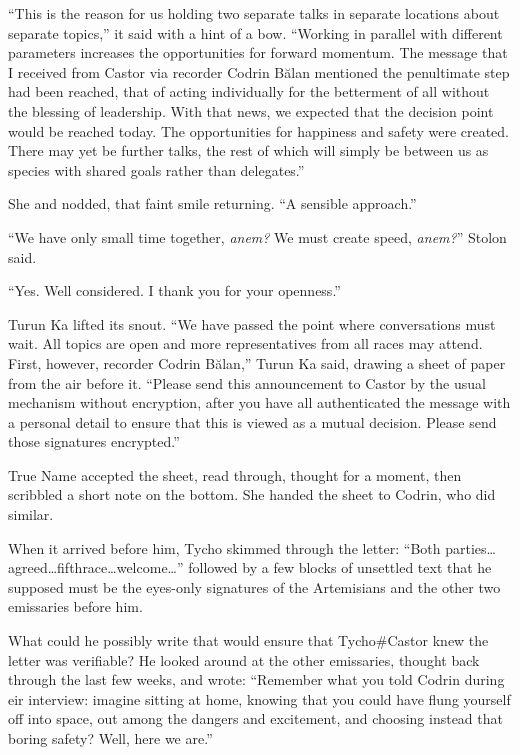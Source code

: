 ``This is the reason for us holding two separate talks in separate locations about separate topics,'' it said with a hint of a bow. ``Working in parallel with different parameters increases the opportunities for forward momentum. The message that I received from Castor via recorder Codrin Bălan mentioned the penultimate step had been reached, that of acting individually for the betterment of all without the blessing of leadership. With that news, we expected that the decision point would be reached today. The opportunities for happiness and safety were created. There may yet be further talks, the rest of which will simply be between us as species with shared goals rather than delegates.''

She and nodded, that faint smile returning. ``A sensible approach.''

``We have only small time together, \emph{anem?} We must create speed, \emph{anem?}'' Stolon said.

``Yes. Well considered. I thank you for your openness.''

Turun Ka lifted its snout. ``We have passed the point where conversations must wait. All topics are open and more representatives from all races may attend. First, however, recorder Codrin Bălan,'' Turun Ka said, drawing a sheet of paper from the air before it. ``Please send this announcement to Castor by the usual mechanism without encryption, after you have all authenticated the message with a personal detail to ensure that this is viewed as a mutual decision. Please send those signatures encrypted.''

True Name accepted the sheet, read through, thought for a moment, then scribbled a short note on the bottom. She handed the sheet to Codrin, who did similar.

When it arrived before him, Tycho skimmed through the letter: ``Both parties\ldots agreed\ldots fifthrace\ldots welcome\ldots{}'' followed by a few blocks of unsettled text that he supposed must be the eyes-only signatures of the Artemisians and the other two emissaries before him.

What could he possibly write that would ensure that Tycho\#Castor knew the letter was verifiable? He looked around at the other emissaries, thought back through the last few weeks, and wrote: ``Remember what you told Codrin during eir interview: imagine sitting at home, knowing that you could have flung yourself off into space, out among the dangers and excitement, and choosing instead that boring safety? Well, here we are.''

